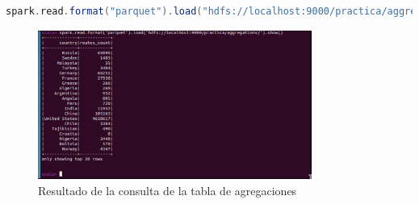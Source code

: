 \begin{lstlisting}[language=scala]
spark.read.format("parquet").load("hdfs://localhost:9000/practica/aggregations/").show()
\end{lstlisting}

\begin{figure}[H]
    \centering
    \includegraphics[width=0.8\textwidth]{figures/68.png}
    \caption{Resultado de la consulta de la tabla de agregaciones}
    \label{fig:carga-consulta}
\end{figure}
